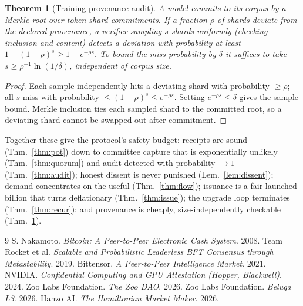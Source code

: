 \documentclass[11pt]{article}
\newtheorem{theorem}{Theorem}
\begin{document}
\begin{theorem}[Training-provenance audit]
\label{thm:prov}
A model commits to its corpus by a Merkle root over token-shard commitments. If a fraction $\rho$ of shards deviate from the declared provenance, a verifier sampling $s$ shards uniformly (checking inclusion and content) detects a deviation with probability at least $1-(1-\rho)^s\ge 1-e^{-\rho s}$. To bound the miss probability by $\delta$ it suffices to take $s\ge\rho^{-1}\ln(1/\delta)$, independent of corpus size.
\end{theorem}
\begin{proof}
Each sample independently hits a deviating shard with probability $\ge\rho$; all $s$ miss with probability $\le(1-\rho)^s\le e^{-\rho s}$. Setting $e^{-\rho s}\le\delta$ gives the sample bound. Merkle inclusion ties each sampled shard to the committed root, so a deviating shard cannot be swapped out after commitment.
\end{proof}

\noindent Together these give the protocol's safety budget: receipts are sound (Thm.~\ref{thm:pot}) down to committee capture that is exponentially unlikely (Thm.~\ref{thm:quorum}) and audit-detected with probability $\to1$ (Thm.~\ref{thm:audit}); honest dissent is never punished (Lem.~\ref{lem:dissent}); demand concentrates on the useful (Thm.~\ref{thm:flow}); issuance is a fair-launched billion that turns deflationary (Thm.~\ref{thm:issue}); the upgrade loop terminates (Thm.~\ref{thm:recur}); and provenance is cheaply, size-independently checkable (Thm.~\ref{thm:prov}).

\begin{thebibliography}{9}
 S. Nakamoto. \emph{Bitcoin: A Peer-to-Peer Electronic Cash System}. 2008.
 Team Rocket et al. \emph{Scalable and Probabilistic Leaderless BFT Consensus through Metastability}. 2019.
 Bittensor. \emph{A Peer-to-Peer Intelligence Market}. 2021.
 NVIDIA. \emph{Confidential Computing and GPU Attestation (Hopper, Blackwell)}. 2024.
 Zoo Labs Foundation. \emph{The Zoo DAO}. 2026.
 Zoo Labs Foundation. \emph{Beluga L3}. 2026.
 Hanzo AI. \emph{The Hamiltonian Market Maker}. 2026.
\end{thebibliography}
\end{document}
